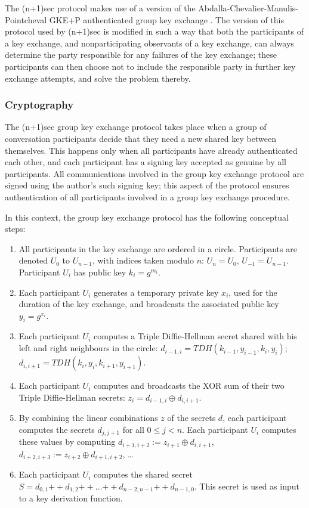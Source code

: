 \documentclass{article}
\def\concat{\mathbin{+\!\!\!+}}
\def\xor{\oplus}
\begin{document}
The (n+1)sec protocol makes use of a version of the Abdalla-Chevalier-Manulis-Pointcheval GKE+P authenticated group key exchange \cite{acmp}.
The version of this protocol used by (n+1)sec is modified in such a way that both the participants of a key exchange, and nonparticipating observants of a key exchange, can always determine the party responsible for any failures of the key exchange; these participants can then choose not to include the responsible party in further key exchange attempts, and solve the problem thereby.


\subsubsection{Cryptography}
\label{sec:cryptography/group-key-exchange/cryptography}

The (n+1)sec group key exchange protocol takes place when a group of conversation participants decide that they need a new shared key between themselves.
This happens only when all participants have already authenticated each other, and each participant has a signing key accepted as genuine by all participants.
All communications involved in the group key exchange protocol are signed using the author's such signing key; this aspect of the protocol ensures authentication of all participants involved in a group key exchange procedure.

In this context, the group key exchange protocol has the following conceptual steps:
\begin{enumerate}
\item All participants in the key exchange are ordered in a circle. Participants are denoted $U_0$ to $U_{n-1}$, with indices taken modulo $n$: $U_n = U_0$, $U_{-1} = U_{n-1}$. Participant $U_i$ has public key $k_i = g^{m_i}$.
\item Each participant $U_i$ generates a temporary private key $x_i$, used for the duration of the key exchange, and broadcasts the associated public key $y_i = g^{x_i}$.
\item Each participant $U_i$ computes a Triple Diffie-Hellman secret shared with his left and right neighbours in the circle: $d_{i-1, i} = TDH(k_{i-1}, y_{i-1}, k_i, y_i)$; $d_{i, i+1} = TDH(k_i, y_i, k_{i+1}, y_{i+1})$.
\item Each participant $U_i$ computes and broadcasts the XOR sum of their two Triple Diffie-Hellman secrets: $z_i = d_{i-1, i} \xor d_{i, i+1}$.
\item By combining the linear combinations $z$ of the secrets $d$, each participant computes the secrets $d_{j, j+1}$ for all $0 \leq j < n$. Each participant $U_i$ computes these values by computing $d_{i+1, i+2} := z_{i+1} \xor d_{i, i+1}$, $d_{i+2, i+3} := z_{i+2} \xor d_{i+1, i+2}$, \ldots
\item Each participant $U_i$ computes the shared secret $S = d_{0, 1} \concat d_{1, 2} \concat \ldots \concat d_{n-2, n-1} \concat d_{n-1, 0}$. This secret is used as input to a key derivation function.
\end{enumerate}
\end{document}
